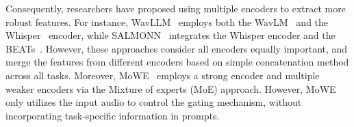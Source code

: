 Consequently, researchers have proposed using multiple encoders to extract more robust features. For instance, WavLLM~\cite{hu2024wavllmrobustadaptivespeech} employs both the WavLM~\cite{chen2021wavlm} and the Whisper~\cite{radford2022robust} encoder, while SALMONN~\cite{tang2024salmonn} integrates the Whisper encoder and the BEATs~\cite{chen2023beats}. However, these approaches consider all encoders equally important, and merge the features from different encoders based on simple concatenation method across all tasks. Moreover, MoWE~\cite{zhang2024moweaudiomultitaskaudiollmsmixture} employs a strong encoder and multiple weaker encoders via the Mixture of experts (MoE) approach. However, MoWE only utilizes the input audio to control the gating mechanism, without incorporating task-specific information in prompts.
 
